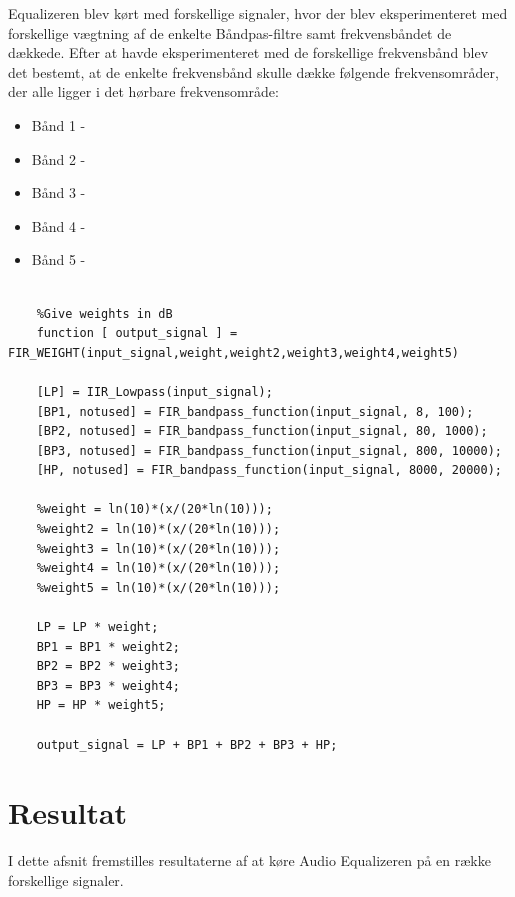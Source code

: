 Equalizeren blev kørt med forskellige signaler, hvor der blev eksperimenteret med forskellige vægtning af de enkelte Båndpas-filtre samt frekvensbåndet de dækkede. Efter at havde eksperimenteret med de forskellige frekvensbånd blev det bestemt, at de enkelte frekvensbånd skulle dække følgende frekvensområder, der alle ligger i det hørbare frekvensområde:
\begin{itemize}
	\item Bånd 1 -
	\item Bånd 2 -
	\item Bånd 3 -
	\item Bånd 4 -
	\item Bånd 5 -
\end{itemize}

\begin{verbatim}
	
	%Give weights in dB
	function [ output_signal ] = FIR_WEIGHT(input_signal,weight,weight2,weight3,weight4,weight5)
	
	[LP] = IIR_Lowpass(input_signal);
	[BP1, notused] = FIR_bandpass_function(input_signal, 8, 100);
	[BP2, notused] = FIR_bandpass_function(input_signal, 80, 1000);
	[BP3, notused] = FIR_bandpass_function(input_signal, 800, 10000);
	[HP, notused] = FIR_bandpass_function(input_signal, 8000, 20000);
	
	%weight = ln(10)*(x/(20*ln(10)));
	%weight2 = ln(10)*(x/(20*ln(10)));
	%weight3 = ln(10)*(x/(20*ln(10)));
	%weight4 = ln(10)*(x/(20*ln(10)));
	%weight5 = ln(10)*(x/(20*ln(10)));
	
	LP = LP * weight;
	BP1 = BP1 * weight2;
	BP2 = BP2 * weight3;
	BP3 = BP3 * weight4;
	HP = HP * weight5;
	
	output_signal = LP + BP1 + BP2 + BP3 + HP;
\end{verbatim}

\section{Resultat}
I dette afsnit fremstilles resultaterne af at køre Audio Equalizeren på en række forskellige signaler.
